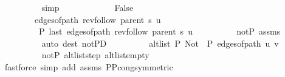 \begin{isabellebody}
\ \ \ \ \ \ \ \ \isamarkupfalse%
\ simp\isanewline
\ \ \ \ \isamarkupfalse%
\isanewline
\ \ \ \ \ \ \isamarkupfalse%
\ False\isanewline
\ \ \ \ \ \ \isamarkupfalse%
\isanewline
\ \ \ \ \ \ \ \ {\isachardoublequoteopen}edges{\isacharunderscore}{\kern0pt}of{\isacharunderscore}{\kern0pt}path\ {\isacharparenleft}{\kern0pt}rev{\isacharunderscore}{\kern0pt}follow\ {\isacharparenleft}{\kern0pt}parent\ s{\isacharparenright}{\kern0pt}\ u{\isacharparenright}{\kern0pt}\ {\isasymnoteq}\ {\isacharbrackleft}{\kern0pt}{\isacharbrackright}{\kern0pt}{\isachardoublequoteclose}\isanewline
\ \ \ \ \ \ \ \ {\isachardoublequoteopen}{\isasymnot}\ P{\isacharprime}{\kern0pt}{\isacharprime}{\kern0pt}\ {\isacharparenleft}{\kern0pt}last\ {\isacharparenleft}{\kern0pt}edges{\isacharunderscore}{\kern0pt}of{\isacharunderscore}{\kern0pt}path\ {\isacharparenleft}{\kern0pt}rev{\isacharunderscore}{\kern0pt}follow\ {\isacharparenleft}{\kern0pt}parent\ s{\isacharparenright}{\kern0pt}\ u{\isacharparenright}{\kern0pt}{\isacharparenright}{\kern0pt}{\isacharparenright}{\kern0pt}{\isachardoublequoteclose}\isanewline
\ \ \ \ \ \ \ \ \isamarkupfalse%
\ not{\isacharunderscore}{\kern0pt}P{\isacharprime}{\kern0pt}\ assms{\isacharparenleft}{\kern0pt}{}{\isacharparenright}{\kern0pt}\isanewline
\ \ \ \ \ \ \ \ \isamarkupfalse%
\ {\isacharparenleft}{\kern0pt}auto\ dest{\isacharcolon}{\kern0pt}\ not{\isacharunderscore}{\kern0pt}P{\isacharprime}{\kern0pt}D{\isacharparenright}{\kern0pt}\isanewline
\ \ \ \ \ \ \isamarkupfalse%
\ \isamarkupfalse%
\ {\isachardoublequoteopen}alt{\isacharunderscore}{\kern0pt}list\ P{\isacharprime}{\kern0pt}{\isacharprime}{\kern0pt}\ {\isacharparenleft}{\kern0pt}Not\ {\isasymcirc}\ P{\isacharprime}{\kern0pt}{\isacharprime}{\kern0pt}{\isacharparenright}{\kern0pt}\ {\isacharparenleft}{\kern0pt}edges{\isacharunderscore}{\kern0pt}of{\isacharunderscore}{\kern0pt}path\ {\isacharbrackleft}{\kern0pt}u{\isacharcomma}{\kern0pt}\ v{\isacharbrackright}{\kern0pt}{\isacharparenright}{\kern0pt}{\isachardoublequoteclose}\isanewline
\ \ \ \ \ \ \ \ \isamarkupfalse%
\ not{\isacharunderscore}{\kern0pt}P{\isacharprime}{\kern0pt}\ alt{\isacharunderscore}{\kern0pt}list{\isacharunderscore}{\kern0pt}step\ alt{\isacharunderscore}{\kern0pt}list{\isacharunderscore}{\kern0pt}empty\isanewline
\ \ \ \ \ \ \ \ \isamarkupfalse%
\ {\isacharparenleft}{\kern0pt}fastforce\ simp\ add{\isacharcolon}{\kern0pt}\ assms{\isacharparenleft}{\kern0pt}{}{\isacharparenright}{\kern0pt}\ P{\isacharunderscore}{\kern0pt}P{\isacharprime}{\kern0pt}{\isacharprime}{\kern0pt}{\isacharunderscore}{\kern0pt}cong{\isacharbrackleft}{\kern0pt}symmetric{\isacharbrackright}{\kern0pt}{\isacharparenright}{\kern0pt}\isanewline

\end{isabellebody}
